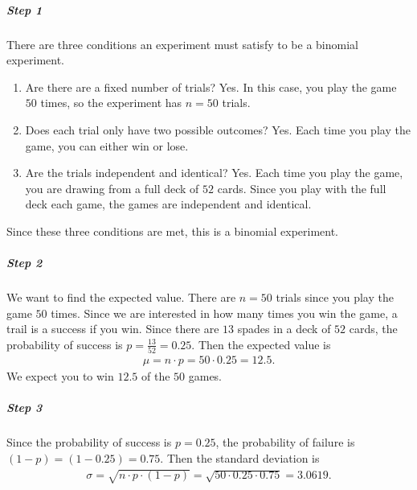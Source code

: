 \documentclass[letterpaper,10pt,english]{jupyterBook}
\begin{document}
\subparagraph{Step 1}
\label{\detokenize{Ch3 Probability/3.6 The Binomial Distribution:step-1}}
\sphinxAtStartPar
There are three conditions an experiment must satisfy to be a binomial experiment.
\begin{enumerate}
%
\item {} 
\sphinxAtStartPar
Are there are a fixed number of trials? Yes. In this case, you play the game \(50\) times, so the experiment has \(n = 50\) trials.

\item {} 
\sphinxAtStartPar
Does each trial only have two possible outcomes? Yes. Each time you play the game, you can either win or lose.

\item {} 
\sphinxAtStartPar
Are the trials independent and identical? Yes. Each time you play the game, you are drawing from a full deck of \(52\) cards. Since you play with the full deck each game, the games are independent and identical.

\end{enumerate}

\sphinxAtStartPar
Since these three conditions are met, this is a binomial experiment.


\subparagraph{Step 2}
\label{\detokenize{Ch3 Probability/3.6 The Binomial Distribution:step-2}}
\sphinxAtStartPar
We want to find the expected value. There are \(n = 50\) trials since you play the game \(50\) times. Since we are interested in how many times you win the game, a trail is a success if you win. Since there are \(13\) spades in a deck of \(52\) cards, the probability of success is \(p = \frac{13}{52} = 0.25\). Then the expected value is
\begin{equation*}
\begin{split} \mu = n \cdot p = 50 \cdot 0.25 = 12.5. \end{split}
\end{equation*}
\sphinxAtStartPar
We expect you to win \(12.5\) of the \(50\) games.


\subparagraph{Step 3}
\label{\detokenize{Ch3 Probability/3.6 The Binomial Distribution:step-3}}
\sphinxAtStartPar
Since the probability of success is \(p = 0.25\), the probability of failure is \((1 - p) = (1 - 0.25) = 0.75\). Then the standard deviation is
\begin{equation*}
\begin{split} \sigma = \sqrt{n \cdot p \cdot (1 - p)} = \sqrt{50 \cdot 0.25 \cdot 0.75} = 3.0619. \end{split}
\end{equation*}
\end{document}
